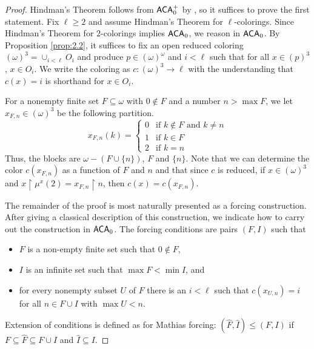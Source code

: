 \documentclass{amsart}
\theoremstyle{definition}
\theoremstyle{remark}
\newcommand{\system}[1]{\mbox{\fontfamily{cmss}\fontshape{n}\fontseries{m}%
    \selectfont#1}}
\newcommand{\ACA}{\system{ACA}\ensuremath{_0}}
\newcommand{\restrict}{\upharpoonright}
\begin{document}
\begin{proof} Hindman's Theorem follows from $\ACA^+$ by \cite{bhs},
so it suffices to prove the first statement.
Fix $\ell \geq 2$ and assume Hindman's Theorem for $\ell$-colorings. Since Hindman's Theorem for $2$-colorings implies $\ACA$, we reason in $\ACA$. 
By Proposition \ref{prop:2.2}, it suffices to fix an open reduced coloring $(\omega)^3 = \cup_{i < \ell} O_i$ and produce 
$p \in (\omega)^\omega$ and $i < \ell$ such that for all $x \in (p)^3$, $x \in O_i$. We write the coloring as 
$c : (\omega)^3 \to \ell$ with the understanding that $c(x)=i$ is shorthand for $x \in O_i$. 

For a nonempty finite set $F \subseteq \omega$ with $0 \notin F$ and a number $n > \max F$, we let $x_{F,n} \in (\omega)^3$ be the following partition.
	\[
		x_{F,n}(k) =
		\begin{cases}
			0 & \text{if } k \notin F \text{ and } k \neq n\\
			1 & \text{if } k \in F\\
			2 & \text{if } k = n
		\end{cases}
	\]
Thus, the blocks are $\omega - (F \cup \{ n \})$, $F$ and $\{ n \}$. Note that we can determine the color $c(x_{F,n})$ as a function of $F$ and 
$n$ and that since $c$ is reduced, if $x \in (\omega)^3$ and $x \restrict \mu^x(2) = x_{F,n} \restrict n$, then 
$c(x) = c(x_{F,n})$.  
	
The remainder of the proof is most naturally presented as a forcing construction. After giving a classical description of this construction, we indicate how 
to carry out the construction in $\ACA$. The forcing conditions are pairs
$(F,I)$ such that
	\begin{itemize}
		\item $F$ is a non-empty finite set such that $0 \notin F$,
		\item $I$ is an infinite set such that $\max F < \min I$, and
		\item for every nonempty subset $U$ of $F$ there is an
                  $i < \ell$ such that $c(x_{U,n}) = i$ for all $n \in
                  F \cup I$ with $\max U < n$.
	\end{itemize}
Extension of conditions is defined as for Mathias forcing:
$(\widehat{F},\widehat{I}) \leq (F,I)$ if $F \subseteq \widehat{F}
\subseteq F \cup I$ and $\widehat{I} \subseteq I$.
	

\end{proof}
\end{document}
